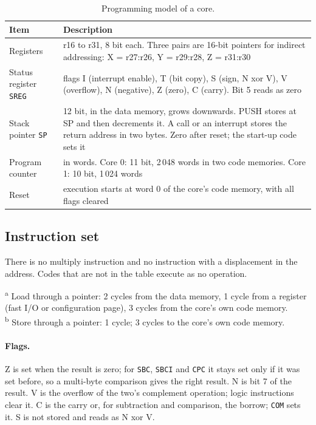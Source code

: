 \documentclass[10pt,a4paper]{article}
\newcommand{\reg}[1]{\texttt{#1}}
\begin{document}
\begin{table}[H]
\centering\small
\begin{tabularx}{\linewidth}{@{}lL@{}}
\toprule
Item & Description \\
\midrule
Registers & r16 to r31, 8 bit each. Three pairs are 16-bit pointers for indirect addressing: X = r27:r26, Y = r29:r28, Z = r31:r30 \\
Status register \reg{SREG} & flags I (interrupt enable), T (bit copy), S (sign, N xor V), V (overflow), N (negative), Z (zero), C (carry). Bit 5 reads as zero \\
Stack pointer \reg{SP} & 12 bit, in the data memory, grows downwards. PUSH stores at SP and then decrements it. A call or an interrupt stores the return address in two bytes. Zero after reset; the start-up code sets it \\
Program counter & in words. Core 0: 11 bit, 2\,048 words in two code memories. Core 1: 10 bit, 1\,024 words \\
Reset & execution starts at word 0 of the core's code memory, with all flags cleared \\
\bottomrule
\end{tabularx}
\caption{Programming model of a core.}
\end{table}



\subsection{Instruction set}

There is no multiply instruction and no instruction with a displacement in the address. Codes that are not in
the table execute as no operation.



\noindent\textsuperscript{a} Load through a pointer: 2 cycles from the data memory, 1 cycle from a register (fast I/O or
configuration page), 3 cycles from the core's own code memory.\\
\textsuperscript{b} Store through a pointer: 1 cycle; 3 cycles to the core's own code memory.

\paragraph{Flags.} Z is set when the result is zero; for \texttt{SBC}, \texttt{SBCI} and \texttt{CPC} it stays set only
if it was set before, so a multi-byte comparison gives the right result. N is bit 7 of the result. V is the
overflow of the two's complement operation; logic instructions clear it. C is the carry or, for subtraction
and comparison, the borrow; \texttt{COM} sets it. S is not stored and reads as N xor V.
\end{document}
